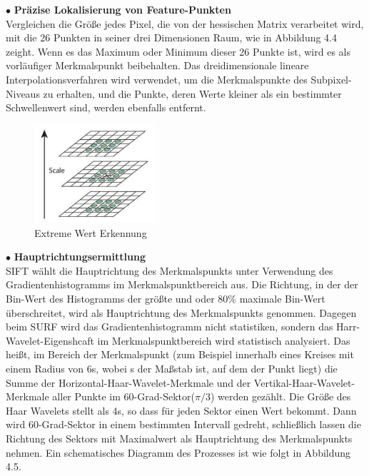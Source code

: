 $\bullet$ \textbf{Präzise Lokalisierung von Feature-Punkten}\\
Vergleichen die Größe jedes Pixel, die von der hessischen Matrix verarbeitet wird, mit die 26 Punkten in seiner drei Dimensionen Raum, wie in Abbildung 4.4 zeight. Wenn es das Maximum oder Minimum dieser 26 Punkte ist, wird es als vorläufiger Merkmalspunkt beibehalten. Das dreidimensionale lineare Interpolationsverfahren wird verwendet, um die Merkmalspunkte des Subpixel-Niveaus zu erhalten, und die Punkte, deren Werte kleiner als ein bestimmter Schwellenwert sind, werden ebenfalls entfernt.

\begin{figure}[htb]
 \centering 
 \includegraphics[keepaspectratio,width=0.4\textwidth]{images/4_ZweiteErfahrung/Extreme_Wert_Erkennung.pdf}
 \caption{Extreme Wert Erkennung}
 \label{fig:Extreme Wert Erkennung}
\end{figure} 


$\bullet$ \textbf{Hauptrichtungsermittlung}\\
SIFT wählt die Hauptrichtung des Merkmalspunkts unter Verwendung des Gradientenhistogramms im Merkmalspunktbereich aus. Die Richtung, in der der Bin-Wert des Histogramms der größte und oder 80\% maximale Bin-Wert  überschreitet, wird als Hauptrichtung des Merkmalspunkts genommen. Dagegen beim SURF wird das Gradientenhistogramm nicht statistiken, sondern das Harr-Wavelet-Eigenshcaft im Merkmalspunktbereich wird statistisch analysiert. Das heißt, im Bereich der Merkmalspunkt (zum Beispiel innerhalb eines Kreises mit einem Radius von 6s, wobei s der Maßstab ist, auf dem der Punkt liegt) die Summe der Horizontal-Haar-Wavelet-Merkmale und der Vertikal-Haar-Wavelet-Merkmale aller Punkte im  60-Grad-Sektor($\pi/3$) werden gezählt. Die Größe des Haar Wavelets stellt als 4s, so dass für jeden Sektor einen Wert bekommt. Dann wird 60-Grad-Sektor in einem bestimmten Intervall gedreht, schließlich lassen die Richtung des Sektors mit Maximalwert als Hauptrichtung des Merkmalspunkts nehmen. Ein schematisches Diagramm des Prozesses ist wie folgt in Abbildung 4.5.

